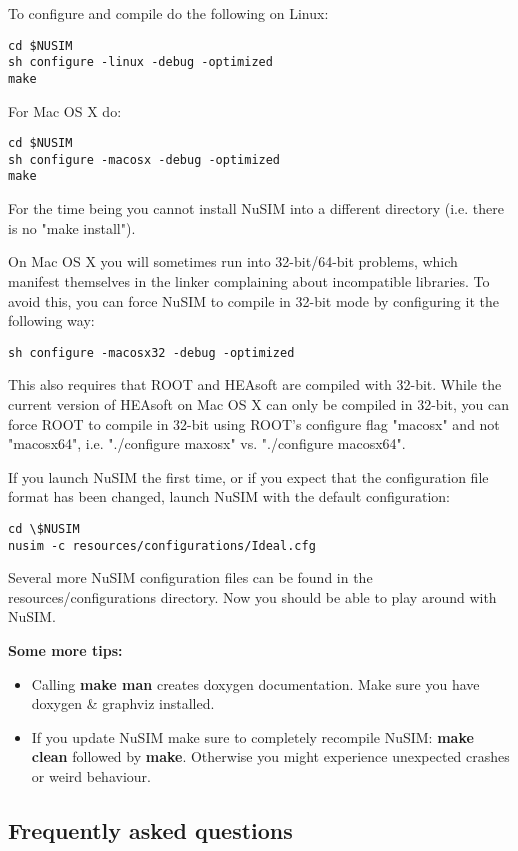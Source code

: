 To configure and compile do the following on Linux:
\begin{verbatim}
cd $NUSIM 
sh configure -linux -debug -optimized
make
\end{verbatim}
For Mac OS X do: 
\begin{verbatim}
cd $NUSIM 
sh configure -macosx -debug -optimized
make
\end{verbatim}
For the time being you cannot install NuSIM into a different directory (i.e. there is no "make install"). 

On Mac OS X you will sometimes run into 32-bit/64-bit problems, which manifest themselves in the linker complaining about incompatible libraries. 
To avoid this, you can force NuSIM to compile in 32-bit mode by configuring it the following way: 
\begin{verbatim}
sh configure -macosx32 -debug -optimized
\end{verbatim}
This also requires that ROOT and HEAsoft are compiled with 32-bit. While the current version of HEAsoft on Mac OS X can only be compiled in 32-bit, you can force ROOT to compile in 32-bit using ROOT's configure flag "macosx" and not "macosx64", i.e. "./configure maxosx" vs. "./configure macosx64".

If you launch NuSIM the first time, or if you expect that the configuration file format has been changed, launch NuSIM with the default configuration:
\begin{verbatim}
cd \$NUSIM
nusim -c resources/configurations/Ideal.cfg
\end{verbatim}

Several more NuSIM configuration files can be found in the resources/configurations directory. Now you should be able to play around with NuSIM.

\textbf{Some more tips:}
\begin{itemize}
\item Calling \textbf{make man} creates doxygen documentation. Make sure you have doxygen \& graphviz installed.
\item If you update NuSIM make sure to completely recompile NuSIM: \textbf{make clean} followed by \textbf{make}. Otherwise you might experience unexpected crashes or weird behaviour. 
\end{itemize}

\subsection{Frequently asked questions}


